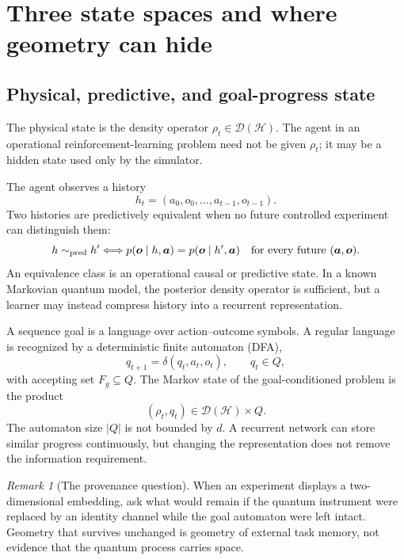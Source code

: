 \documentclass[11pt]{article}
\theoremstyle{definition}
\theoremstyle{remark}
\newtheorem{remark}[theorem]{Remark}
\newcommand{\Dens}{\mathcal D}
\begin{document}
\section{Three state spaces and where geometry can hide}
\label{sec:states}

\subsection{Physical, predictive, and goal-progress state}

The physical state is the density operator $\rho_t\in\Dens(\mathcal H)$.
The agent in an operational reinforcement-learning problem need not be given
$\rho_t$; it may be a hidden state used only by the simulator.

The agent observes a history
\begin{equation}
  h_t=(a_0,o_0,\ldots,a_{t-1},o_{t-1}).
  \label{eq:history}
\end{equation}
Two histories are predictively equivalent when no future controlled
experiment can distinguish them:
\begin{equation}
 h\sim_{\rm pred}h'
 \Longleftrightarrow
 p(\bm o\mid h,\bm a)=p(\bm o\mid h',\bm a)
 \quad\text{for every future }(\bm a,\bm o).
 \label{eq:predictive-equivalence}
\end{equation}
An equivalence class is an operational causal or predictive state. In a known
Markovian quantum model, the posterior density operator is sufficient, but a
learner may instead compress history into a recurrent representation.

A sequence goal is a language over action--outcome symbols. A regular
language is recognized by a deterministic finite automaton (DFA),
\begin{equation}
  q_{t+1}=\delta(q_t,a_t,o_t),\qquad q_t\in Q,
  \label{eq:dfa}
\end{equation}
with accepting set $F_g\subseteq Q$. The Markov state of the
goal-conditioned problem is the product
\begin{equation}
  (\rho_t,q_t)\in\Dens(\mathcal H)\times Q.
  \label{eq:product-state}
\end{equation}
The automaton size $|Q|$ is not bounded by $d$. A recurrent network can store
similar progress continuously, but changing the representation does not remove
the information requirement.

\begin{remark}[The provenance question]
When an experiment displays a two-dimensional embedding, ask what would remain
if the quantum instrument were replaced by an identity channel while the goal
automaton were left intact. Geometry that survives unchanged is geometry of
external task memory, not evidence that the quantum process carries space.
\end{remark}
\end{document}
